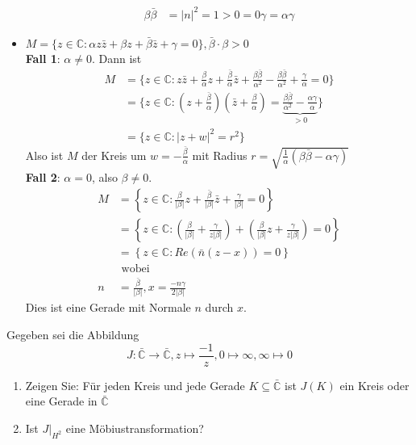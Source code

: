 \begin{solution}
\begin{itemize}
\begin{align*}
      \beta \bar{\beta} &= \vert n \vert^2 = 1 > 0 = 0 \gamma = \alpha \gamma
    \end{align*} 
    \item \( M = \{ z \in \mathbb{C} : \alpha z \bar{z} + \beta z + \bar{\beta} \bar{z} + \gamma = 0 \}, \bar{\beta} \cdot \beta > 0 \) \\
    \textbf{Fall 1}: \( \alpha \neq 0 \). Dann ist
    \begin{align*}
      M &= \{ z \in \mathbb{C} : z \bar{z} + \frac{\beta}{\alpha}z + \frac{\bar{\beta}}{\alpha} \bar{z} + \frac{\beta \bar{\beta}}{\alpha^2} - \frac{\beta \bar{\beta}}{\alpha^2} + \frac{\gamma}{\alpha} = 0\} \\
      &= \{ z \in \mathbb{C} : (z + \frac{\bar{\beta}}{\alpha})(\bar{z} + \frac{\beta}{\alpha}) = \underbrace{\frac{\beta \bar{\beta}}{\alpha^2} - \frac{\alpha \gamma}{\alpha}}_{> 0} \} \\
      &= \{ z \in \mathbb{C} : \vert z + w \vert^2 = r^2\}
    \end{align*}
    Also ist \( M \) der Kreis um \( w = -\frac{\bar{\beta}}{\alpha} \) mit Radius \( r = \sqrt{ \frac{1}{\alpha} (\beta \bar{\beta} - \alpha \gamma)} \) \\
    \textbf{Fall 2}: \( \alpha = 0 \), also \( \beta \neq 0 \). \\
    \begin{align*}
      M &= \left \{ z \in \mathbb{C} : \frac{\beta}{\vert \beta \vert} z + \frac{\bar{\beta}}{\vert \beta \vert} \bar{z} + \frac{\gamma}{\vert \beta \vert} = 0 \right \} \\
      &= \left \{ z \in \mathbb{C} : \left(\frac{\beta}{\vert \beta \vert} + \frac{\gamma}{z\vert \beta \vert} \right) + \left(\frac{\beta}{\vert \beta \vert}z + \frac{\gamma}{z\vert \beta \vert} \right)= 0 \right \} \\
      &= \left \{ z \in \mathbb{C} : Re(\bar{n}(z-x)) = 0 \right \} \\
      &\text{ wobei} \\
      n &= \frac{\bar{\beta}}{\vert \beta \vert}, x = \frac{-n \gamma}{2\vert \beta \vert}  
    \end{align*}
    Dies ist eine Gerade mit Normale \( n \) durch \( x \).
  \end{itemize}
\end{solution}
\begin{assignment}
 Gegeben sei die Abbildung
 \begin{equation*}
   J: \bar{\mathbb{C}} \to \bar{\mathbb{C}}, z \mapsto \frac{-1}{z}, 0 \mapsto \infty, \infty \mapsto 0
 \end{equation*}
 \begin{enumerate}[label=(\alph*)] 
  \item Zeigen Sie: Für jeden Kreis und jede Gerade $ K \subseteq \bar{\mathbb{C}} $ ist $J(K)$ ein Kreis oder eine Gerade in $\bar{\mathbb{C}} $
  \item Ist $J\bigg\rvert_{ H^2 }$ eine Möbiustransformation?
 \end{enumerate}
\end{assignment}
